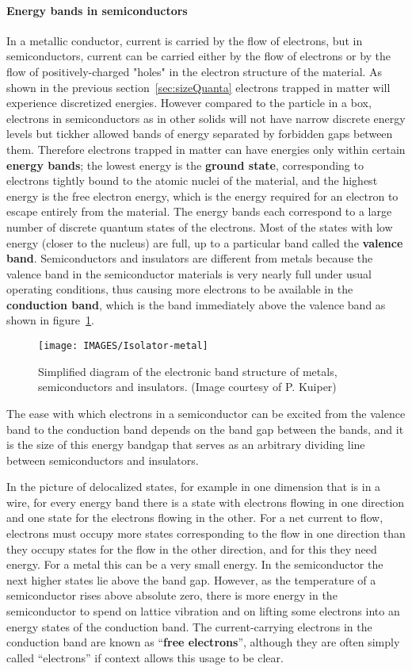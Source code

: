 \paragraph{Energy bands in semiconductors}
In a metallic conductor, current is carried by the flow of electrons, but in semiconductors, current can be carried either by the flow of electrons or by the flow of positively-charged "holes" in the electron structure of the material.
As shown in the previous section~\ref{sec:sizeQuanta} electrons trapped in matter will experience discretized energies. However compared to the particle in a box, electrons in semiconductors as in other solids will not have narrow discrete energy levels but tickher allowed bands of energy separated by forbidden gaps between them. Therefore electrons trapped in matter can have energies only within certain \textbf{energy bands}; the lowest energy is the \textbf{ground state}, corresponding to electrons tightly bound to the atomic nuclei of the material, and the highest energy is the free electron energy, which is the energy required for an electron to escape entirely from the material.
The energy bands each correspond to a large number of discrete quantum states of the electrons. Most of the states with low energy (closer to the nucleus) are full, up to a particular band called the \textbf{valence band}. Semiconductors and insulators are different from metals because the valence band in the semiconductor materials is very nearly full under usual operating conditions, thus causing more electrons to be available in the \textbf{conduction band}, which is the band immediately above the valence band as shown in figure~\ref{fig:metalInsulator}.
\begin{figure} 
 \centering
 \texttt{[image: IMAGES/Isolator-metal]}
 \caption{Simplified diagram of the electronic band structure of metals, semiconductors and insulators.
(Image courtesy of P. Kuiper)}
 \label{fig:metalInsulator}
\end{figure}
The ease with which electrons in a semiconductor can be excited from the valence band to the conduction band depends on the band gap between the bands, and it is the size of this energy bandgap that serves as an arbitrary dividing line between semiconductors and insulators.

In the picture of delocalized states, for example in one dimension that is in a wire, for every energy band there is a state with electrons flowing in one direction and one state for the electrons flowing in the other.
For a net current to flow, electrons must occupy more states corresponding to the flow in one direction than they occupy states for the flow in the other direction, and for this they need energy. For a metal this can be a very small energy. In the semiconductor the next higher states lie above the band gap. However, as the temperature of a semiconductor rises above absolute zero, there is more energy in the semiconductor to spend on lattice vibration and on lifting some electrons into an energy states of the conduction band. The current-carrying electrons in the conduction band are known as ``\textbf{free electrons}'', although they are often simply called ``electrons'' if context allows this usage to be clear.

